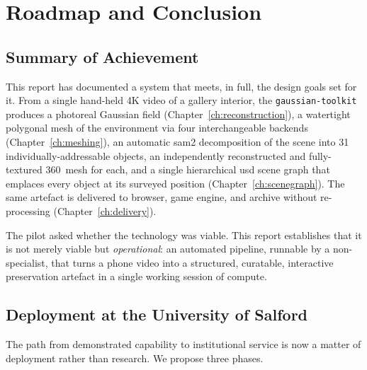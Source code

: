 \chapter{Roadmap and Conclusion}
\label{ch:roadmap}

\section{Summary of Achievement}
\label{sec:road-summary}

This report has documented a system that meets, in full, the design goals set for it. From a single hand-held 4K video of a gallery interior, the \texttt{gaussian-toolkit} produces a photoreal Gaussian field (Chapter~\ref{ch:reconstruction}), a watertight polygonal mesh of the environment via four interchangeable backends (Chapter~\ref{ch:meshing}), an automatic \acrshort{sam}2 decomposition of the scene into 31 individually-addressable objects, an independently reconstructed and fully-textured 360\textdegree\ mesh for each, and a single hierarchical \acrshort{usd} scene graph that emplaces every object at its surveyed position (Chapter~\ref{ch:scenegraph}). The same artefact is delivered to browser, game engine, and archive without re-processing (Chapter~\ref{ch:delivery}).

The pilot asked whether the technology was viable. This report establishes that it is not merely viable but \emph{operational}: an automated pipeline, runnable by a non-specialist, that turns a phone video into a structured, curatable, interactive preservation artefact in a single working session of compute.

\section{Deployment at the University of Salford}
\label{sec:road-deploy}

The path from demonstrated capability to institutional service is now a matter of deployment rather than research. We propose three phases.

